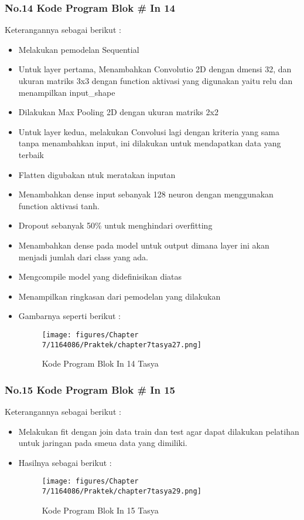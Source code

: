 \subsubsection{No.14 Kode Program Blok \# In 14}

Keterangannya sebagai berikut :
\begin{itemize}
\item Melakukan pemodelan Sequential
\item Untuk layer pertama, Menambahkan Convolutio 2D dengan dmensi 32, dan ukuran matriks 3x3 dengan function aktivasi yang digunakan yaitu relu dan menampilkan input\_shape
\item Dilakukan Max Pooling 2D dengan ukuran matriks 2x2
\item Untuk layer kedua, melakukan Convolusi lagi dengan kriteria yang sama tanpa menambahkan input, ini dilakukan untuk mendapatkan data yang terbaik
\item Flatten digubakan ntuk meratakan inputan
\item Menambahkan dense input sebanyak 128 neuron dengan menggunakan function aktivasi tanh.
\item Dropout sebanyak 50\% untuk menghindari overfitting
\item Menambahkan dense pada model untuk output dimana layer ini akan menjadi jumlah dari class yang ada.
\item Mengcompile model yang didefinisikan diatas
\item Menampilkan ringkasan dari pemodelan yang dilakukan
\item Gambarnya seperti berikut :
\begin{figure}[ht]
\centering
\texttt{[image: figures/Chapter 7/1164086/Praktek/chapter7tasya27.png]}
\caption{Kode Program Blok In 14 Tasya}
\label{Praktek}
\end{figure}
\end{itemize}

\subsubsection{No.15 Kode Program Blok \# In 15}

Keterangannya sebagai berikut :
\begin{itemize}
\item Melakukan fit dengan join data train dan test agar dapat dilakukan pelatihan untuk jaringan pada smeua data yang dimiliki.
\item Hasilnya sebagai berikut :
\begin{figure}[ht]
\centering
\texttt{[image: figures/Chapter 7/1164086/Praktek/chapter7tasya29.png]}
\caption{Kode Program Blok In 15 Tasya}
\label{Praktek}
\end{figure}
\end{itemize}

